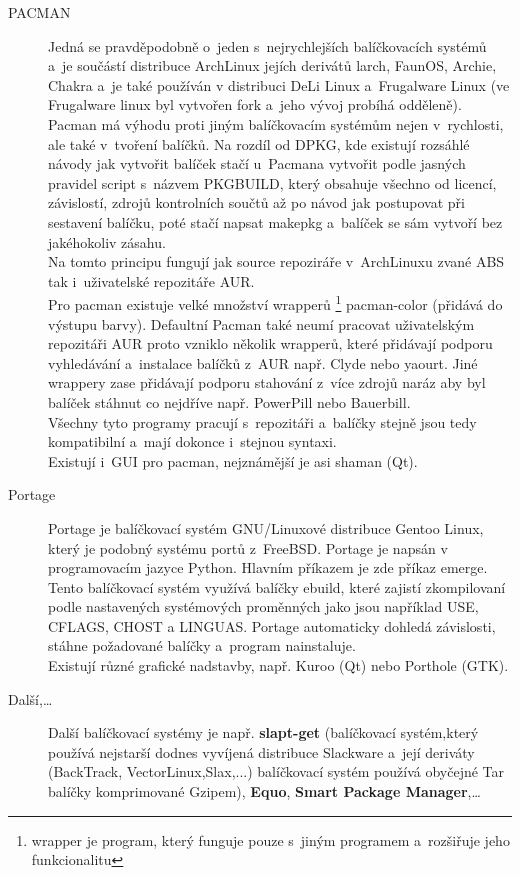 \documentclass[a4paper,12pt]{article}
\renewcommand{\b}[1]{\textbf{#1}} %
\begin{document}
\begin{description}
 \item[PACMAN] Jedná se pravděpodobně o~jeden s~nejrychlejších balíčkovacích systémů a~je součástí distribuce ArchLinux jejích derivátů larch, FaunOS, Archie, Chakra a~je také používán v distribuci DeLi Linux a~Frugalware Linux (ve Frugalware linux byl vytvořen fork a~jeho vývoj probíhá odděleně). Pacman má výhodu proti jiným balíčkovacím systémům nejen v~rychlosti, ale také v~tvoření balíčků. Na rozdíl od DPKG, kde existují rozsáhlé návody jak vytvořit balíček stačí u~Pacmana vytvořit podle jasných pravidel script s~názvem PKGBUILD, který obsahuje všechno od licencí, závislostí, zdrojů kontrolních součtů až po návod jak postupovat při sestavení balíčku, poté stačí napsat makepkg a~balíček se sám vytvoří bez jakéhokoliv zásahu.\\
Na tomto principu fungují jak source repoziráře v~ArchLinuxu zvané ABS tak i~uživatelské repozitáře AUR.\\
Pro pacman existuje velké množství wrapperů
\footnote{wrapper je program, který funguje pouze s~jiným programem a~rozšiřuje jeho funkcionalitu} pacman-color (přidává do výstupu barvy). Defaultní Pacman také neumí pracovat uživatelským repozitáři AUR proto vzniklo několik wrapperů, které přidávají podporu vyhledávání a~instalace balíčků z~AUR např. Clyde nebo yaourt. Jiné wrappery zase přidávají podporu stahování z~více zdrojů naráz aby byl balíček stáhnut co nejdříve např. PowerPill nebo Bauerbill.\\
Všechny tyto programy pracují s~repozitáři a~balíčky stejně jsou tedy kompatibilní a~mají dokonce i~stejnou syntaxi.\\
Existují i~GUI pro pacman, nejznámější je asi shaman (Qt).
 \item[Portage] Portage je balíčkovací systém GNU/Linuxové distribuce Gentoo Linux, který je podobný systému portů z~FreeBSD. Portage je napsán v programovacím jazyce Python. Hlavním příkazem je zde příkaz emerge. Tento balíčkovací systém využívá balíčky ebuild, které zajistí zkompilovaní podle nastavených systémových proměnných jako jsou například USE, CFLAGS, CHOST a LINGUAS. Portage automaticky dohledá závislosti, stáhne požadované balíčky a~program nainstaluje.\\
Existují různé grafické nadstavby, např. Kuroo (Qt) nebo Porthole (GTK).
 \item[Další,…] Další balíčkovací systémy je např. \b{slapt-get} (balíčkovací systém,který používá nejstarší dodnes vyvíjená distribuce Slackware a~její deriváty (BackTrack, VectorLinux,Slax,...) balíčkovací systém používá obyčejné Tar balíčky komprimované Gzipem), \b{Equo}, \b{Smart Package Manager},…
 \end{description}
\end{document}
